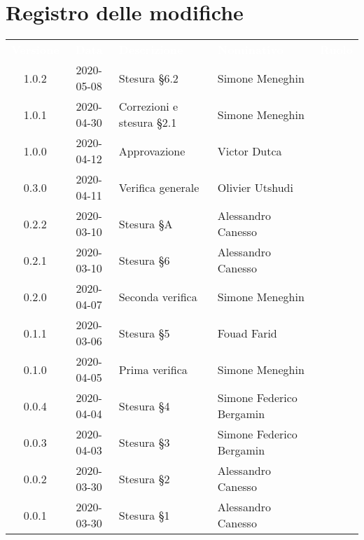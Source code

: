 \section*{Registro delle modifiche}
{
	\centering
	\begin{longtable}{ c c  C{4cm}  C{4cm}  C{3cm} }
		\textcolor{white}{\textbf{Versione}} & \textcolor{white}{\textbf{Data}} & \textcolor{white}{\textbf{Descrizione}} & \textcolor{white}{\textbf{Nominativo}} & \textcolor{white}{\textbf{Ruolo}}\\		
		1.0.2 & 2020-05-08 & Stesura \S 6.2 & Simone Meneghin &\adm{} \\
		1.0.1 & 2020-04-30 & Correzioni e stesura \S 2.1 & Simone Meneghin &\Res{} \\
		1.0.0 & 2020-04-12 & Approvazione & Victor Dutca &\RdP{} \\
		0.3.0 & 2020-04-11 & Verifica generale & Olivier Utshudi &\ver{} \\
		0.2.2 & 2020-03-10 & Stesura \S A & Alessandro Canesso &\Res{} \\
		0.2.1 & 2020-03-10 & Stesura \S 6 & Alessandro Canesso &\Res{} \\
		0.2.0 & 2020-04-07 & Seconda verifica & Simone Meneghin &\ver{} \\
		0.1.1 & 2020-03-06 & Stesura \S 5  & Fouad Farid &\Res{} \\
		0.1.0 & 2020-04-05 & Prima verifica & Simone Meneghin &\ver{} \\
		0.0.4 & 2020-04-04 & Stesura \S 4  & Simone Federico Bergamin &\adm{}\\	
		0.0.3 & 2020-04-03 & Stesura \S 3  & Simone Federico Bergamin &\adm{}\\	
		0.0.2 & 2020-03-30 & Stesura \S 2  & Alessandro Canesso &\Res{}\\	
		0.0.1 & 2020-03-30 & Stesura \S 1  & Alessandro Canesso &\Res{}\\		
	\end{longtable}
} 
